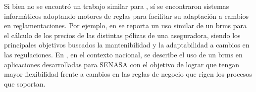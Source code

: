 
Si bien no se encontró un trabajo similar para , sí se encontraron sistemas informáticos adoptando motores de reglas para facilitar su adaptación a cambios en reglamentaciones. 
Por ejemplo, en \cite{medic2019calculation} se reporta un uso similar de un \acrfull{brms} \cite{proctor2012drools} para el cálculo de los precios de las distintas pólizas de una aseguradora, siendo los principales objetivos buscados la mantenibilidad y la adaptabilidad a cambios en las regulaciones.
%
En \cite{sampol2019sistema}, en el contexto nacional, se describe el uso de un \acrshort{brms} en aplicaciones desarrolladas para SENASA con el objetivo de lograr que tengan mayor flexibilidad frente a cambios en las reglas de negocio que rigen los procesos que soportan.

